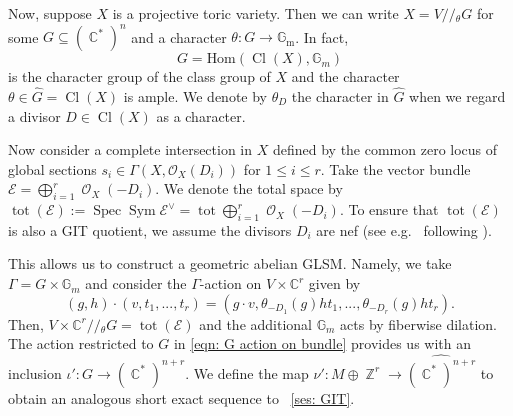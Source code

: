 \documentclass[reqno, 12pt]{amsart}
\theoremstyle{definition}
\newcommand{\op}[1]{\operatorname{#1}}
\newcommand{\modmod}[1]{/ \! \! / \!_{#1}}
\newcommand{\newterm}{\textsf}
\newcommand{\Hom}{\text{Hom}}
\def\Z{\op{\mathbb{Z}}}
\def\C{\op{\mathbb{C}}}
\def\O{\op{\mathcal{O}}}
\def\A{\op{\mathbb{A}}}
\def\Gm{\op{\mathbb{G}_m}}
\def\n{n}
\def\tot{\op{tot}}
\numberwithin{equation}{section}
\begin{document}
Now, suppose $X$ is a projective toric variety. Then  we can write $X= V \modmod{\theta} G$ for some $G \subseteq (\C^*)^{\n}$ and a character $\theta: G \to \Gm$.  In fact, 
\[
G = \Hom(\op{Cl}(X), \mathbb G_m)
\]
is the character group of the class group of $X$ and the character $\theta \in \widehat G = \op{Cl}(X)$ is ample. We denote by $\theta_{D}$ the character in $\widehat{G}$ when we regard a divisor $D \in \op{Cl}(X)$ as a character.

Now consider a complete intersection in $X$ defined by the common zero locus of global sections $s_i \in \Gamma(X, \mathcal O_X(D_i))$ for $1 \le i \le r$.  
Take the vector bundle $\mathcal E = \bigoplus_{i=1}^r \O_{X}(-D_i)$.  We denote the total space by $\tot(\mathcal E) := \op{Spec} \op{Sym} \mathcal E^\vee = \op{tot} \bigoplus_{i=1}^r \O_{X}(-D_i)$.  To ensure that $\tot(\mathcal E)$ is also a GIT quotient, we assume the divisors $D_i$ are nef (see e.g.\ \cite[Lemma 5.19]{FK17} following \cite[Chapters 6 and 7]{CLS}).  


This allows us to construct a geometric abelian GLSM. Namely,  we take $\Gamma = G \times \mathbb G_m$ and consider the $\Gamma$-action on $V \times \mathbb C^r$ given by 
\begin{equation}\label{eqn: G action on bundle}
(g, h) \cdot(v, t_1, ..., t_r) = (g \cdot v,  \theta_{-D_1}(g)ht_1, ..., \theta_{-D_r}(g)ht_r).
\end{equation}
Then, $V \times \mathbb C^r \modmod{\theta} G = \tot(\mathcal E)$ and the additional $\mathbb G_m$ acts by fiberwise dilation.  The action restricted to $G$ in \eqref{eqn: G action on bundle} provides us with an inclusion $\iota': G \to (\C^*)^{\n + r}$. We define the map $\nu': M\oplus \Z^r \to \widehat{(\C^*)^{\n+r}}$ to obtain an analogous short exact sequence to ~\eqref{ses: GIT}.



\end{document}
